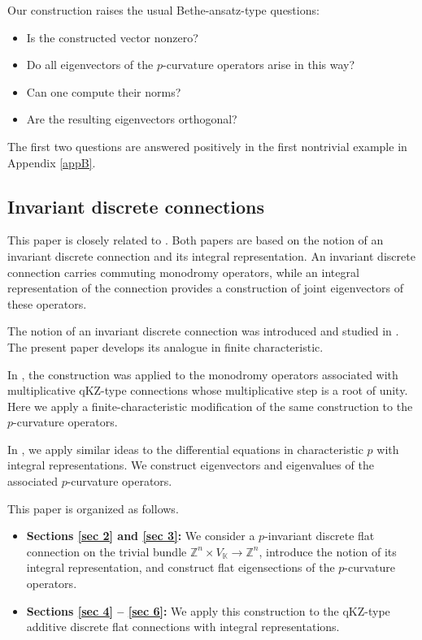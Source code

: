 \documentclass[12pt]{amsart}
\theoremstyle{definition} %
\numberwithin{equation}{section}
\theoremstyle{definition}
\def\Z{{\mathbb Z}}
\def\K{{\mathbb K}}
\begin{document}
\medskip
Our construction raises the usual Bethe-ansatz-type questions:
\begin{itemize}
\item
Is the constructed vector nonzero?
\item Do all eigenvectors of the $p$-curvature operators arise in this way?
\item Can one compute their norms?
\item Are the resulting eigenvectors orthogonal?
\end{itemize}

The first two questions are answered positively in the first nontrivial example in Appendix \ref{appB}.


\subsection{Invariant discrete connections} 


This paper is closely related to \cite{TV3}. Both papers are based on the notion of an invariant discrete connection and its integral representation. An invariant discrete connection carries commuting monodromy operators, while an integral representation of the connection provides a construction of joint eigenvectors of these operators.

The notion of an invariant discrete connection was introduced and studied in \cite{TV3}. The present paper develops its analogue in finite characteristic.

 
 In \cite{TV3}, the construction was applied to the monodromy operators associated
with multiplicative qKZ-type connections whose multiplicative step is a root of unity.
Here we apply a finite-characteristic modification of the same construction to the
$p$-curvature operators.

In \cite{TV4}, we apply similar ideas to the
 differential equations in characteristic $p$ with integral representations.
We construct eigenvectors and eigenvalues of the associated $p$-curvature operators. 


\medskip







This paper is organized as follows.
\begin{itemize}
\item \textbf{Sections \ref{sec 2} and \ref{sec 3}:} We consider
a $p$-invariant discrete flat connection on the trivial  bundle
$\Z^{n}\times V_\K \to \Z^{n}$, introduce the notion of its integral representation, and
construct flat eigensections of the $p$-curvature operators.

\item \textbf{Sections \ref{sec 4} -- \ref{sec 6}:} We apply this construction to the qKZ-type
additive discrete flat connections with integral representations.
\end{itemize}
\end{document}
